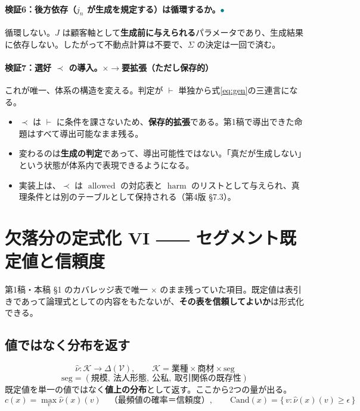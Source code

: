 \documentclass[11pt,a4paper]{article}
\newcommand{\allowed}{\operatorname{allowed}}
\newcommand{\harm}{\operatorname{harm}}
\newcommand{\OK}{\textcolor{teal}{$\bullet$}}
\renewcommand{\NG}{\textcolor{crim}{$\times$}}
\begin{document}
\paragraph{検証6：後方依存（$j_n$ が生成を規定する）は循環するか。\quad\OK}
循環しない。$J$ は顧客軸として\textbf{生成前に与えられる}パラメータであり、生成結果に依存しない。したがって不動点計算は不要で、$\Sigma$ の決定は一回で済む。

\paragraph{検証7：選好 $\prec$ の導入。\quad\NG$\to$要拡張（ただし保存的）}
これが唯一、体系の構造を変える。判定が $\vdash$ 単独から式\eqref{eq:gen}の三連言になる。
\begin{itemize}
\item $\prec$ は $\vdash$ に条件を課さないため、\textbf{保存的拡張}である。第1稿で導出できた命題はすべて導出可能なまま残る。
\item 変わるのは\textbf{生成の判定}であって、導出可能性ではない。「真だが生成しない」という状態が体系内で表現できるようになる。
\item 実装上は、$\prec$ は $\allowed$ の対応表と $\harm$ のリストとして与えられ、真理条件とは別のテーブルとして保持される（第4版 \S7.3）。
\end{itemize}


\section{欠落分の定式化 VI ―― セグメント既定値と信頼度}

第1稿・本稿 \S1 のカバレッジ表で唯一 \NG{} のまま残っていた項目。既定値は表引きであって論理式としての内容をもたないが、\textbf{その表を信頼してよいか}は形式化できる。

\subsection{値ではなく分布を返す}

\[
\hat\nu : \mathcal{K} \to \Delta(\mathcal{V}), \qquad
\mathcal{K} = \text{業種} \times \text{商材} \times \mathrm{seg}
\]
\[
\mathrm{seg} = (\text{規模},\ \text{法人形態},\ \text{公私},\ \text{取引関係の既存性})
\]
既定値を単一の値ではなく\textbf{値上の分布}として返す。ここから2つの量が出る。
\[
c(x) = \max_{v} \hat\nu(x)(v) \quad\text{（最頻値の確率＝信頼度）},
\qquad
\mathrm{Cand}(x) = \{\, v : \hat\nu(x)(v) \geq \epsilon \,\}
\]
\end{document}
